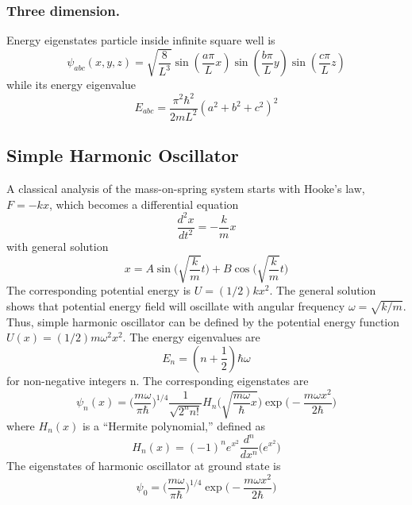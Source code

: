\documentclass[../main.tex]{subfiles}
\begin{document}
\subsubsection*{Three dimension.} Energy eigenstates particle inside infinite square well is
\begin{equation*}
    \psi_{abc}(x,y,z)=\sqrt{\frac{8}{L^3}}\sin( \frac{a \pi }{L}x) \sin( \frac{b \pi }{L}y) \sin( \frac{c \pi }{L}z)
\end{equation*}
while its energy eigenvalue
\begin{equation*}
    E_{abc}=\frac{\pi^2\hbar^2}{2mL^2}(a^2+b^2+c^2)^2
\end{equation*}

\subsection*{Simple Harmonic Oscillator}
A classical analysis of the mass-on-spring system starts with Hooke's law, $F = -kx$, which becomes a differential equation 
\begin{equation*}
    \frac{d^2x}{dt^2}=-\frac{k}{m}x
\end{equation*}
with general solution
\begin{equation*}
    x=A\sin \biggl(\sqrt{\frac{k}{m}} t\biggr)+ B \cos \biggl(\sqrt{\frac{k}{m}} t\biggr)
\end{equation*}
The corresponding potential energy is $U=(1/2)kx^2$. The general solution shows that potential energy field will oscillate with angular frequency $\omega = \sqrt{k/m}$. Thus, simple harmonic oscillator can be defined by the potential energy function $U(x) = (1/2)m\omega^2x^2$. The energy eigenvalues are
\begin{equation*}
    E_n = (n + \frac{1}{2})\hbar\omega
\end{equation*}
for non-negative integers n. The corresponding eigenstates are
\begin{equation*}
    \psi_n(x)=\biggl(\frac{m\omega}{\pi \hbar} \biggr)^{1/4}\frac{1}{\sqrt{2^nn!}}H_n \biggl(\sqrt{ \frac{m\omega}{\hbar}x } \biggr) \exp\biggl(-\frac{ m\omega x^2}{2\hbar}\biggr)
\end{equation*}
where $H_n(x)$ is a “Hermite polynomial,” defined as
\begin{equation*}
    H_n(x)=(-1)^ne^{x^2} \frac{d^n}{dx^n}\biggl( e^{x^2} \biggr)
\end{equation*}
The eigenstates of harmonic oscillator at ground state is
\begin{equation*}
    \psi_0=\biggl( \frac{m\omega}{\pi \hbar} \biggr)^{1/4}  \exp\biggl(-\frac{ m\omega x^2}{2\hbar}\biggr)
\end{equation*} 
\end{document}

